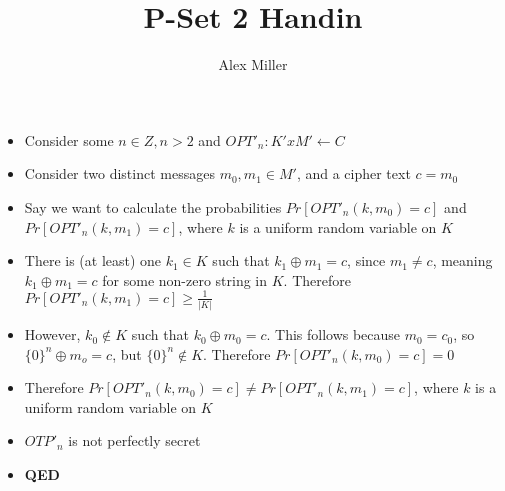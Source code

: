 \documentclass[]{article}
\title{P-Set 2 Handin}
\author{Alex Miller}
\begin{document}
\maketitle

\section{}
\begin{itemize}
	\item Consider some $n \in Z, n > 2$ and $OPT'_n: K' x M' \leftarrow C$
	\item Consider two distinct messages $m_0, m_1 \in M'$, and a cipher text $c = m_0$
	\item Say we want to calculate the probabilities $Pr[OPT'_n(k, m_0) = c]$ and $ Pr[OPT'_n(k, m_1) = c]$, where $k$ is a uniform random variable on $K$
	\item There is (at least) one $k_1 \in K$ such that $k_1 \oplus m_1 = c$, since $m_1 \neq c$, meaning $k_1 \oplus m_1 = c$ for some non-zero string in $K$. Therefore $Pr[OPT'_n(k, m_1) = c] \geq \frac{1}{|K|}$
	\item However, $k_0 \notin K$ such that $k_0 \oplus m_0 = c$. This follows because $m_0 = c_0$, so $\{0\}^n \oplus m_o = c$, but $\{0\}^n \notin K$. Therefore $Pr[OPT'_n(k, m_0) = c] = 0$
	\item Therefore $Pr[OPT'_n(k, m_0) = c] \neq Pr[OPT'_n(k, m_1) = c]$, where $k$ is a uniform random variable on $K$
	\item $OTP'_n$ is not perfectly secret
	\item \textbf{QED}
	\iffalse
	\item $OTP'_1$ is not perfectly secret because it can only encode one message, and is therefore just plain not secret
	\item $OTP'_2$ is not perfectly secret:
	\begin{enumerate}
		\item Let $OPT'_2: K x M \leftarrow C$, where $K, M = {01, 10, 11}$ and $C = {00, 01, 10, 11}$
		\item Say we wanted to encrypt a message $m_0 = 01$ and $m_1 = 11$ using $OTP'_2$.
		\item Consider a $c \in C$, $c = 01$
		\item If $OTP'_2$ were perfectly secret, $m_0$ and $m_1$ would be encrypted to $c$ under $OTP'_2$ with equal probability.
		\item However, because $00 \notin K$, $m_0$ never gets encrypted to $c$ under $OTP'_2$, while $m_1$ can by $k = 10$
		\item Therefore $Pr[OPT'_2(k, m_0) = c] \neq Pr[OPT_n(k, m_1) = c]$, where $k$ is a uniform random variable on $K$
	\end{enumerate}
	\item If $OTP'_n$ isn't perfectly secret, neither is $OTP'_{n+1}$
	\begin{enumerate}
		\item 
	\end{enumerate}
	\fi
\end{itemize}
\end{document}
